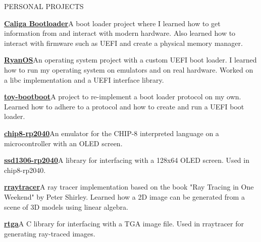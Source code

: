 \documentclass{resume} %
\begin{document}

\begin{rSection}{PERSONAL PROJECTS}
	\itemsep -8pt{}
	\item \href{https://github.com/raccog/caliga-bootloader}{\textbf{Caliga Bootloader}}\quad A boot loader project where I learned how to get information from and interact with modern hardware. Also learned how to interact with firmware such as UEFI and create a physical memory manager.
	\item \href{https://github.com/raccog/RyanOS}{\textbf{RyanOS}}\quad An operating system project with a custom UEFI boot loader. I learned how to run my operating system on emulators and on real hardware. Worked on a libc implementation and a UEFI interface library.
	\item \href{https://github.com/raccog/toy-bootboot}{\textbf{toy-bootboot}}\quad A project to re-implement a boot loader protocol on my own. Learned how to adhere to a protocol and how to create and run a UEFI boot loader.
	\item \href{https://github.com/raccog/chip8-rp2040}{\textbf{chip8-rp2040}}\quad An emulator for the CHIP-8 interpreted language on a microcontroller with an OLED screen.
	\item \href{https://github.com/raccog/ssd1306-rp2040}{\textbf{ssd1306-rp2040}}\quad A library for interfacing with a 128x64 OLED screen. Used in chip8-rp2040.
	\item \href{https://github.com/raccog/rraytracer}{\textbf{rraytracer}}\quad A ray tracer implementation based on the book "Ray Tracing in One Weekend" by Peter Shirley. Learned how a 2D image can be generated from a scene of 3D models using linear algebra.
	\item \href{https://github.com/raccog/rtga}{\textbf{rtga}}\quad A C library for interfacing with a TGA image file. Used in rraytracer for generating ray-traced images.
\end{rSection}
\end{document}
